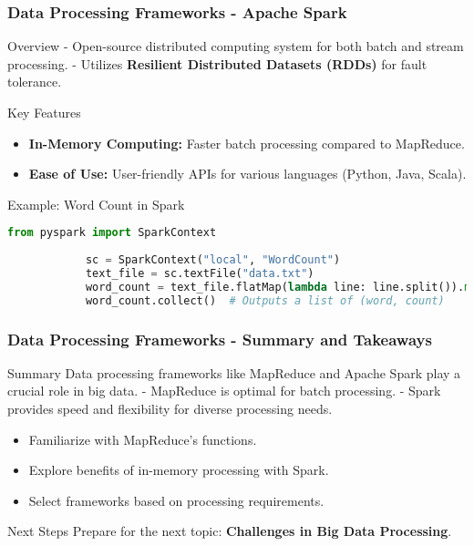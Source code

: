 \documentclass[aspectratio=169]{beamer}
\begin{document}
\begin{frame}[fragile]
    \frametitle{Data Processing Frameworks - Apache Spark}
    \begin{block}{Overview}
        - Open-source distributed computing system for both batch and stream processing.
        - Utilizes \textbf{Resilient Distributed Datasets (RDDs)} for fault tolerance.
    \end{block}
    
    \begin{block}{Key Features}
        \begin{itemize}
            \item \textbf{In-Memory Computing:} Faster batch processing compared to MapReduce.
            \item \textbf{Ease of Use:} User-friendly APIs for various languages (Python, Java, Scala).
        \end{itemize}
    \end{block}
    
    \begin{block}{Example: Word Count in Spark}
        \begin{lstlisting}[language=Python]
            from pyspark import SparkContext
            
            sc = SparkContext("local", "WordCount")
            text_file = sc.textFile("data.txt")
            word_count = text_file.flatMap(lambda line: line.split()).map(lambda word: (word, 1)).reduceByKey(lambda a, b: a + b)
            word_count.collect()  # Outputs a list of (word, count)
        \end{lstlisting}
    \end{block}
\end{frame}

\begin{frame}[fragile]
    \frametitle{Data Processing Frameworks - Summary and Takeaways}
    \begin{block}{Summary}
        Data processing frameworks like MapReduce and Apache Spark play a crucial role in big data. 
        - MapReduce is optimal for batch processing.
        - Spark provides speed and flexibility for diverse processing needs.
    \end{block}
    
    \begin{itemize}
        \item Familiarize with MapReduce's functions.
        \item Explore benefits of in-memory processing with Spark.
        \item Select frameworks based on processing requirements.
    \end{itemize}

    \begin{block}{Next Steps}
        Prepare for the next topic: \textbf{Challenges in Big Data Processing}.
    \end{block}
\end{frame}
\end{document}
